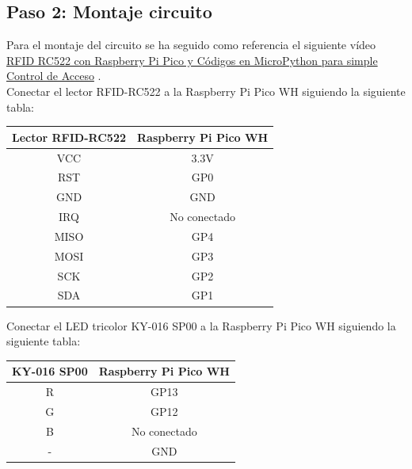 \documentclass{article}
\begin{document}
\subsection{Paso 2: Montaje circuito}
Para el montaje del circuito se ha seguido como referencia el siguiente vídeo \href{https://www.youtube.com/watch?v=bvn_o39uXac}{RFID RC522 con Raspberry Pi Pico y Códigos en MicroPython para simple Control de Acceso} \cite{computadoras2022rfid}.\\
Conectar el lector RFID-RC522 a la Raspberry Pi Pico WH siguiendo la siguiente tabla:

\begin{center}
	\begin{tabular}{|c|c|}
		\hline
		\textbf{Lector RFID-RC522} & \textbf{Raspberry Pi Pico WH} \\
		\hline
		VCC & 3.3V \\
		\hline
		RST & GP0 \\
		\hline
		GND & GND \\
		\hline
		IRQ & No conectado \\
		\hline
		MISO & GP4 \\
		\hline
		MOSI & GP3 \\
		\hline
		SCK & GP2 \\
		\hline
		SDA & GP1 \\
		\hline
	\end{tabular}
\end{center}

\vspace{0.3cm}

Conectar el LED tricolor KY-016 SP00 a la Raspberry Pi Pico WH siguiendo la siguiente tabla:
\begin{center}
	\begin{tabular}{|c|c|}
		\hline
		\textbf{KY-016 SP00} & \textbf{Raspberry Pi Pico WH} \\
		\hline
		R & GP13 \\
		\hline
		G & GP12 \\
		\hline
		B & No conectado \\
		\hline
		- & GND \\
		\hline
	\end{tabular}
\end{center}
\end{document}
